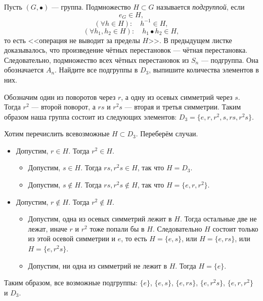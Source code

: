 \documentclass[a4paper,12pt]{article}
\begin{document}
     Пусть $(G, \bullet)$ --- группа. Подмножество $H \subset G$ называется \mbox{\emph{подгруппой}}, если
    \begin{equation*}
        e_G \in H,
    \end{equation*}
    \begin{equation*}
        (\forall h \in H): \quad h^{-1} \in H,
    \end{equation*}
    \begin{equation*}
        (\forall h_1, h_2 \in H): \quad h_1 \bullet h_2 \in H,
    \end{equation*}
    то есть <<операция не выводит за пределы $H$>>.
    \example В предыдущем листке доказывалось, что произведение чётных перестановок --- чётная перестановка. Следовательно, подмножество всех чётных перестановок из $S_n$ --- подгруппа. Она обозначается $A_n$.
    \problem Найдите все подгруппы в $D_3$, выпишите количества элементов в них.
    \begin{solution}
        Обозначим один из поворотов через $r$, а одну из осевых симметрий через $s$. Тогда $r^2$ --- второй поворот, а $rs$ и $r^2s$ --- вторая и третья симметрии. Таким образом наша группа состоит из следующих элементов: $D_3 = \{e, r, r^2, s, rs, r^2s\}$. \par
        Хотим перечислить всевозможные $H \subset D_3$. Переберём случаи.
        \begin{itemize}
            \item Допустим, $r \in H$. Тогда $r^2 \in H$.
            \begin{itemize}
                \item Допустим, $s \in H$. Тогда $rs, r^2s \in H$, так что $H = D_3$.
                \item Допустим, $s \notin H$. Тогда $rs, r^2s \notin H$, так что $H = \{e, r, r^2\}$.
            \end{itemize}
            \item Допустим, $r \notin H$. Тогда $r^2 \notin H$.
            \begin{itemize}
                \item Допустим, одна из осевых симметрий лежит в $H$. Тогда остальные две не лежат, иначе $r$ и $r^2$ тоже попали бы в $H$. Следовательно $H$ состоит только из этой осевой симметрии и $e$, то есть $H = \{e, s\}$, или $H = \{e, rs\}$, или $H = \{e, r^2s\}$.
                \item Допустим, ни одна из симметрий не лежит в $H$. Тогда $H = \{e\}$.
            \end{itemize}
        \end{itemize}
        Таким образом, все возможные подгруппы: $\{e\}$, $\{e, s\}$, $\{e, rs\}$, $\{e, r^2s\}$, $\{e, r, r^2\}$ и $D_3$.
    \end{solution}
\end{document}
